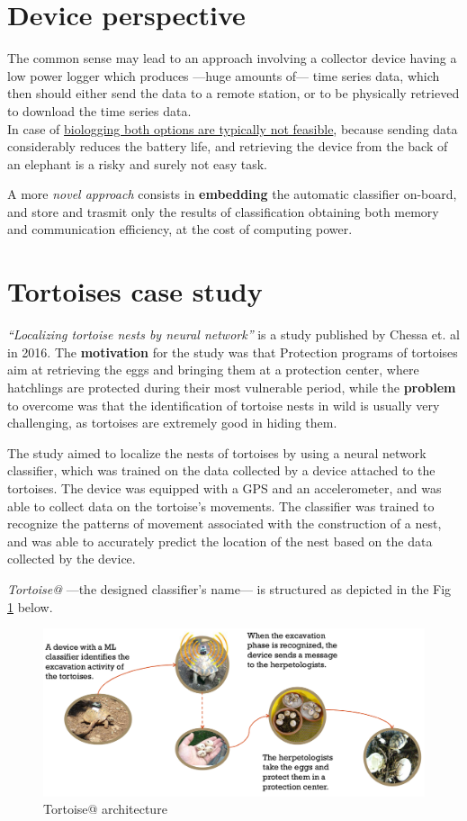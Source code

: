 \section{Device perspective}
The common sense may lead to an approach involving a  collector device having a low power logger which produces ---huge amounts of--- time series data, which then should either send the data to a remote station, or to be physically retrieved to download the time series data.\\
In case of \ul{biologging both options are typically not feasible}, because sending data considerably reduces the battery life, and retrieving the device from the back of an elephant is a risky and surely not easy task. \smiley

A more \textit{novel approach} consists in \textbf{embedding} the automatic classifier on-board, and store and trasmit only the results of classification obtaining both memory and communication efficiency, at the cost of computing power.

\section{Tortoises case study}

\textit{``Localizing tortoise nests by neural network''} is a study published by Chessa et. al in 2016.
The \textbf{motivation} for the study was that Protection programs of tortoises aim at retrieving the eggs and bringing them at a protection center, where hatchlings are protected during their most vulnerable period, while the \textbf{problem} to overcome was that the identification of tortoise nests in wild is usually very challenging, as tortoises are extremely good in hiding them.

The study aimed to localize the nests of tortoises by using a neural network classifier, which was trained on the data collected by a device attached to the tortoises. The device was equipped with a GPS and an accelerometer, and was able to collect data on the tortoise's movements. The classifier was trained to recognize the patterns of movement associated with the construction of a nest, and was able to accurately predict the location of the nest based on the data collected by the device.

\textit{Tortoise@} ---the designed classifier's name--- is structured as depicted in the Fig \ref{fig:tortoise@_architecture} below.
\begin{figure}[htbp]
   \centering
   \includegraphics{images/tortoise@_architecture.png}
   \caption{Tortoise@ architecture}
   \label{fig:tortoise@_architecture}
\end{figure}

